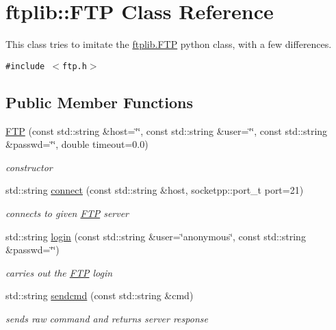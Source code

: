 \hypertarget{classftplib_1_1FTP}{
\section{ftplib::FTP Class Reference}
\label{classftplib_1_1FTP}
}
This class tries to imitate the \hyperlink{classftplib_1_1FTP}{ftplib.FTP} python class, with a few differences.  


{\tt \#include $<$ftp.h$>$}

\subsection*{Public Member Functions}
\begin{CompactItemize}
\item 
\hyperlink{classftplib_1_1FTP_178979abdc58593abdb31a882f370803}{FTP} (const std::string \&host=\char`\"{}\char`\"{}, const std::string \&user=\char`\"{}\char`\"{}, const std::string \&passwd=\char`\"{}\char`\"{}, double timeout=0.0)
\begin{CompactList}\small\item\em constructor \item\end{CompactList}\item 
std::string \hyperlink{classftplib_1_1FTP_fbd3444a33e5dd055474c9a0d6aabba5}{connect} (const std::string \&host, socketpp::port\_\-t port=21)
\begin{CompactList}\small\item\em connects to given \hyperlink{classftplib_1_1FTP}{FTP} server \item\end{CompactList}\item 
std::string \hyperlink{classftplib_1_1FTP_dc39751d00808d35183fb19c483b3589}{login} (const std::string \&user=\char`\"{}anonymous\char`\"{}, const std::string \&passwd=\char`\"{}\char`\"{})
\begin{CompactList}\small\item\em carries out the \hyperlink{classftplib_1_1FTP}{FTP} login \item\end{CompactList}\item 
std::string \hyperlink{classftplib_1_1FTP_5a876d670107df4b5924238450440eee}{sendcmd} (const std::string \&cmd)
\begin{CompactList}\small\item\em sends raw command and returns server response \item\end{CompactList}\item 

\end{CompactItemize}
